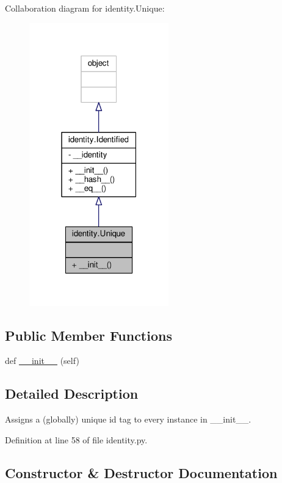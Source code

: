 Collaboration diagram for identity.\+Unique\+:\nopagebreak
\begin{figure}[H]
\begin{center}
\leavevmode
\includegraphics[width=171pt]{classidentity_1_1Unique__coll__graph}
\end{center}
\end{figure}
\subsection*{Public Member Functions}
\begin{DoxyCompactItemize}
\item 
def \hyperlink{classidentity_1_1Unique_ae4ffdf9b31ac906ae437f4a94e90ffbb}{\+\_\+\+\_\+init\+\_\+\+\_\+} (self)
\end{DoxyCompactItemize}


\subsection{Detailed Description}
\begin{DoxyVerb}Assigns a (globally) unique id tag to every instance in __init__.
\end{DoxyVerb}
 

Definition at line 58 of file identity.\+py.



\subsection{Constructor \& Destructor Documentation}
\hypertarget{classidentity_1_1Unique_ae4ffdf9b31ac906ae437f4a94e90ffbb}{}
